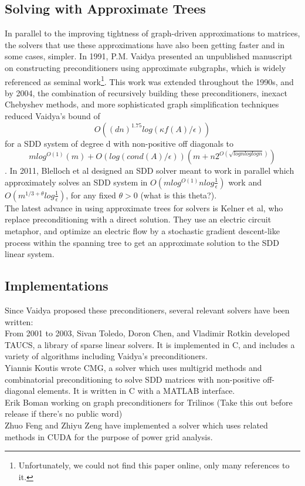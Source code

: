 \documentclass{article}
\begin{document}
\subsection*{Solving with Approximate Trees}
In parallel to the improving tightness of graph-driven approximations to matrices, the solvers that use these approximations have also been getting faster and in some cases, simpler.
In 1991, P.M. Vaidya presented an unpublished manuscript\cite{vaidya} on constructing preconditioners using approximate subgraphs, which is widely referenced as seminal work\footnote{Unfortunately, we could not find this paper online, only many references to it.}.  This work was extended throughout the 1990s, and by 2004, the combination of recursively building these preconditioners, inexact Chebyshev methods, and more sophisticated graph simplification techniques reduced Vaidya's bound of $$O((dn)^{1.75}log(κf(A)/\epsilon))$$ for a SDD system of degree d with non-positive off diagonals to $$mlog^{O(1)}(m)+O(log(cond(A)/\epsilon))(m+n2^{O(\sqrt{lognlog logn})})$$\cite{nearly-linear-sparse}.
In 2011, Blelloch et al designed an SDD solver meant to work in parallel which approximately solves an SDD system in 
$O(mlog^{O(1)}nlog\frac{1}{\epsilon})$ work and $O(m^{1/3 + \theta}log\frac{1}{\epsilon})$, for any fixed $\theta>0$ (what is this theta?).\\


The latest advance in using approximate trees for solvers is Kelner et al\cite{comb-sdd}, who replace preconditioning with a direct solution.  They use an electric circuit metaphor, and optimize an electric flow by a stochastic gradient descent-like process within the spanning tree to get an approximate solution to the SDD linear system.  

\subsection*{Implementations}
Since Vaidya proposed these preconditioners, several relevant solvers have been written:\\
From 2001 to 2003, Sivan Toledo, Doron Chen, and Vladimir Rotkin developed TAUCS\cite{taucs}, a library of sparse linear solvers. 
It is implemented in C, and includes a variety of algorithms including Vaidya's preconditioners.\\
Yiannis Koutis wrote CMG\cite{CMG}, a solver which uses multigrid methods and combinatorial preconditioning to solve SDD matrices with non-positive off-diagonal elements.  It is written in C with a MATLAB interface.\\
Erik Boman working on graph preconditioners for Trilinos (Take this out before release if there's no public word)\\
Zhuo Feng and Zhiyu Zeng have implemented a solver which uses related methods in CUDA for the purpose of power grid analysis.\\
\end{document}
